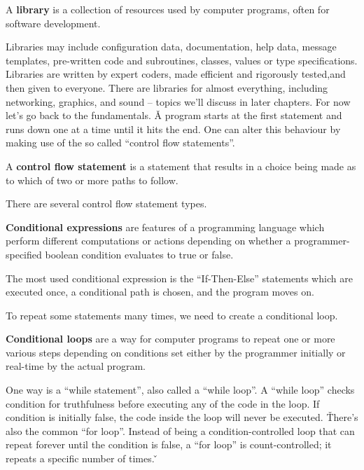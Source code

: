 \bd[Library]
A \textbf{library} is a collection of resources used by computer programs, often for software development.
\ed

Libraries may include configuration data, documentation, help data, message templates, pre-written code and
subroutines, classes, values or type specifications. Libraries are written by expert coders, made efficient and
rigorously tested,and then given to everyone. There are libraries for almost everything, including networking,
graphics, and sound -- topics we'll discuss in later chapters. For now let's go back to the fundamentals. \v

A program starts at the first statement and runs down one at a time until it hits the end. One can alter this
behaviour by making use of the so called ``control flow statements''.

A \textbf{control flow statement} is a statement that results in a choice being made as to which of two or more paths
to follow.
\ed

There are several control flow statement types.

\textbf{Conditional expressions} are features of a programming language which perform different computations or
actions depending on whether a programmer-specified boolean condition evaluates to true or false.
\ed

The most used conditional expression is the ``If-Then-Else'' statements which are executed once, a conditional path
is chosen, and the program moves on.


To repeat some statements many times, we need to create a conditional loop.

\textbf{Conditional loops} are a way for computer programs to repeat one or more various steps depending on
conditions set either by the programmer initially or real-time by the actual program.
\ed

One way is a ``while statement'', also called a ``while loop''. A ``while loop'' checks condition for truthfulness
before executing any of the code in the loop. If condition is initially false, the code inside the loop will never be
executed. \v

There's also the common ``for loop''. Instead of being a condition-controlled loop that can repeat forever until the
condition is false, a ``for loop'' is count-controlled; it repeats a specific number of times. \v

